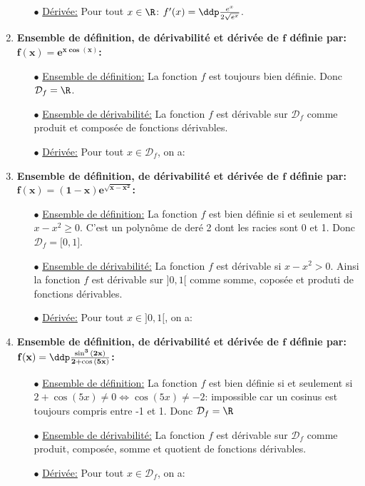 \begin{correction}
\begin{enumerate}
\begin{itemize}
\item[$\bullet$] \underline{D\'eriv\'ee:} Pour tout $x\in\R$: $f^{\prime}(x)=\ddp\frac{e^x}{2\sqrt{e^x}}$.
 \end{itemize} 
\item  \textbf{Ensemble de d\'efinition, de d\'erivabilit\'e et d\'eriv\'ee de $\mathbf{f}$ d\'efinie par: $\mathbf{f(x)=e^{x\cos{(x)}}}$:}
\begin{itemize}
\item[$\bullet$] \underline{Ensemble de d\'efinition:} La fonction $f$ est toujours bien d\'efinie. Donc $\mathcal{D}_f=\R$.
\item[$\bullet$] \underline{Ensemble de d\'erivabilit\'e:} La fonction $f$ est d\'erivable sur $\mathcal{D}_f$ comme produit et compos\'ee de fonctions d\'erivables.
\item[$\bullet$] \underline{D\'eriv\'ee:} Pour tout $x\in\mathcal{D}_f$, on a: 
 \end{itemize}
\item  \textbf{Ensemble de d\'efinition, de d\'erivabilit\'e et d\'eriv\'ee de $\mathbf{f}$ d\'efinie par: $\mathbf{f(x)=(1-x)e^{\sqrt{x-x^2}}}$:}
\begin{itemize}
\item[$\bullet$] \underline{Ensemble de d\'efinition:} La fonction $f$ est bien d\'efinie si et seulement si $x-x^2\geq 0$. C'est un polyn\^{o}me de der\'e 2 dont les racies sont 0 et 1. Donc $\mathcal{D}_f=\lbrack 0,1\rbrack$.
\item[$\bullet$] \underline{Ensemble de d\'erivabilit\'e:} La fonction $f$ est d\'erivable si $x-x^2>0$. Ainsi la fonction $f$ est d\'erivable sur $\rbrack 0,1\lbrack$ comme somme, copos\'ee et produti de fonctions d\'erivables.
\item[$\bullet$] \underline{D\'eriv\'ee:} Pour tout $x\in\rbrack 0,1\lbrack$, on a: 
 \end{itemize}
\item  \textbf{Ensemble de d\'efinition, de d\'erivabilit\'e et d\'eriv\'ee de $\mathbf{f}$ d\'efinie par: $\mathbf{f(x)=\ddp\frac{\sin^3{(2x)}}{2+\cos{(5x)}}}$:}
\begin{itemize}
\item[$\bullet$] \underline{Ensemble de d\'efinition:} La fonction $f$ est bien d\'efinie si et seulement si $2+\cos{(5x)}\not= 0\Leftrightarrow \cos{(5x)}\not= -2$: impossible car un cosinus est toujours compris entre -1 et 1. Donc $\mathcal{D}_f=\R$
\item[$\bullet$] \underline{Ensemble de d\'erivabilit\'e:} La fonction $f$ est d\'erivable sur $\mathcal{D}_f$ comme produit, compos\'ee, somme et quotient de fonctions d\'erivables.
\item[$\bullet$] \underline{D\'eriv\'ee:}  Pour tout $x\in\mathcal{D}_f$, on a:


\end{itemize}
\end{enumerate}
\end{correction}
